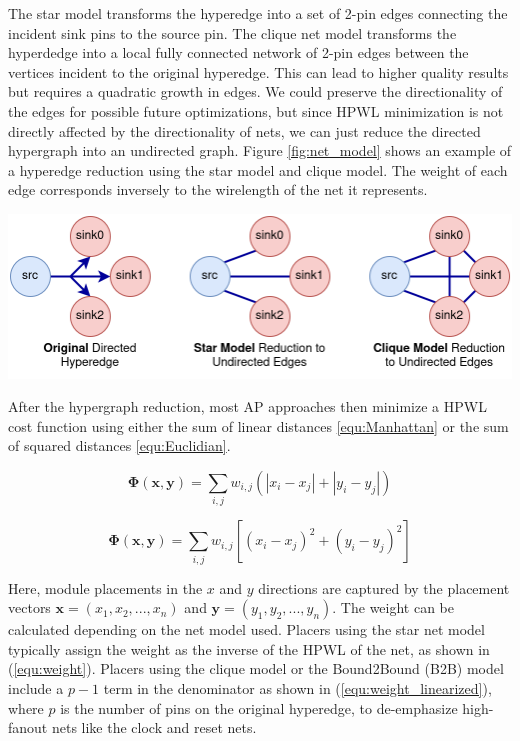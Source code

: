 The star model transforms the hyperedge into a set of 2-pin edges connecting the incident sink pins to the source pin.
The clique net model transforms the hyperdedge into a local fully connected network of 2-pin edges between the vertices incident to the original hyperedge.
This can lead to higher quality results but requires a quadratic growth in edges.
We could preserve the directionality of the edges for possible future optimizations, but since HPWL minimization is not directly affected by the directionality of nets, we can just reduce the directed hypergraph into an undirected graph.
Figure \ref{fig:net_model} shows an example of a hyperedge reduction using the star model and clique model.
The weight of each edge corresponds inversely to the wirelength of the net it represents.

\vspace{1.0cm}
{
    \centering
    \includegraphics[width=\columnwidth]{figures/future_work/net_model.png}
    \label{fig:net_model}
}


After the hypergraph reduction, most AP approaches then minimize a HPWL cost function using either the sum of linear distances \ref{equ:Manhattan} or the sum of squared distances \ref{equ:Euclidian}.

\begin{equation}
    \boldsymbol{\Phi} (\boldsymbol{x}, \boldsymbol{y}) = \sum_{i,j} w_{i,j} \left( |x_i - x_j| + |y_i - y_j| \right)
    \label{equ:Manhattan}
\end{equation}

\begin{equation}
    \boldsymbol{\Phi} (\boldsymbol{x}, \boldsymbol{y}) = \sum_{i,j} w_{i,j} \left[ (x_i - x_j)^2 + (y_i - y_j)^2 \right]
    \label{equ:Euclidian}
\end{equation}

Here, module placements in the \(x\) and \(y\) directions are captured by the placement vectors \( \boldsymbol{x} = (x_1, x_2, ..., x_n) \) and \( \boldsymbol{y} = (y_1, y_2, ..., y_n) \).
The weight can be calculated depending on the net model used.
Placers using the star net model typically assign the weight as the inverse of the HPWL of the net, as shown in (\ref{equ:weight}).
Placers using the clique model or the Bound2Bound (B2B) model include a \(p-1\) term in the denominator as shown in (\ref{equ:weight_linearized}), where \(p\) is the number of pins on the original hyperedge, to de-emphasize high-fanout nets like the clock and reset nets.


